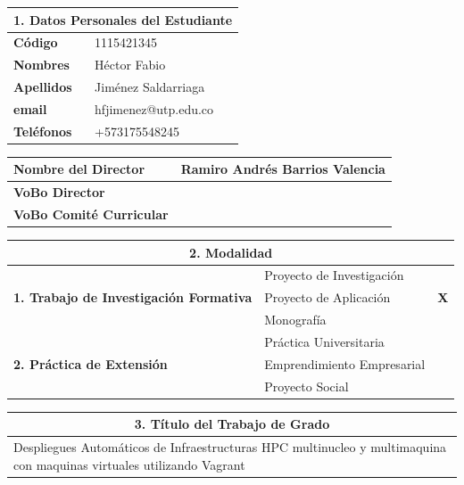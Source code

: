 \documentclass[letter,12pt]{article}
\begin{document}
\sloppy %
\renewcommand{\arraystretch}{1.1} %
\begin{center}
\begin{tabular}{|p{5.5cm}|p{9.5cm}|}
\hline
\multicolumn{2}{|c|}{\textbf{1. Datos Personales del Estudiante}}\\
\hline
\textbf{Código} & 1115421345 \\
\hline
\textbf{Nombres} & Héctor Fabio\\
\hline
\textbf{Apellidos} & Jiménez Saldarriaga\\
\hline
\textbf{email} & hfjimenez@utp.edu.co \\
\hline
\textbf{Teléfonos} &  +573175548245 \\
\hline
\end{tabular}
\end{center}

\begin{center}
\begin{tabular}{|p{5.5cm}|p{9.5cm}|}
\hline
\textbf{Nombre del Director} & Ramiro Andrés Barrios Valencia \\
\hline
\textbf{VoBo Director} &  \\
\hline
\textbf{VoBo Comité Curricular} &  \\
\hline
\end{tabular}
\end{center}
\begin{center}
\begin{tabular}{|p{5.5cm}|p{8.5cm}|p{0.5cm}|}
\hline
\multicolumn{3}{|c|}{\textbf{2. Modalidad}}\\
\hline
\multirow{3}{5cm}{\textbf{1. Trabajo de Investigación Formativa}} & Proyecto de Investigación &  \\ \cline{2-3}
& Proyecto de Aplicación &  \textbf{X}\\ \cline{2-3}
& Monografía &  \\ 
\hline
\multirow{3}{5cm}{\textbf{2. Práctica de Extensión}} & Práctica Universitaria &  \\ \cline{2-3}
& Emprendimiento Empresarial &  \\ \cline{2-3}
& Proyecto Social &  \\
\hline
\end{tabular}
\end{center}
\newpage
\begin{center}
\begin{tabular}{|p{15.5cm}|}
\hline
\multicolumn{1}{|c|}{ \textbf{3. Título del Trabajo de Grado}}\\
\hline
Despliegues Automáticos de Infraestructuras HPC multinucleo y multimaquina con maquinas virtuales utilizando Vagrant\\
\hline
\end{tabular}
\end{center}
    
\end{document}
